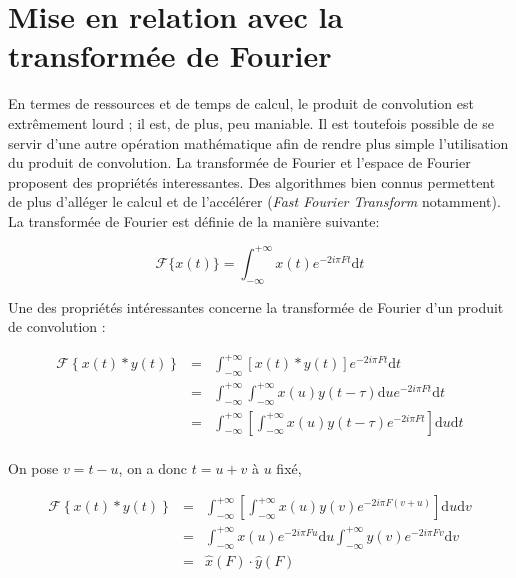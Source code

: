 \section{Mise en relation avec la transformée de Fourier} %

En termes de ressources et de temps de calcul, le produit de convolution est extrêmement lourd ; il est, de plus, peu maniable.
Il est toutefois possible de se servir d'une autre opération mathématique afin de rendre plus simple l'utilisation du produit de convolution.
La transformée de Fourier et l'espace de Fourier proposent des propriétés interessantes. Des algorithmes bien connus permettent de plus d'alléger le calcul et de l'accélérer (\textit{Fast Fourier Transform} notamment).
La transformée de Fourier est définie de la manière suivante:

\begin{equation}
    \mathcal{F}\{x(t)\} = \int_{-\infty}^{+\infty} x(t) e^{-2i\pi Ft} \mathrm dt
\end{equation}

\newpage %

Une des propriétés intéressantes concerne la transformée de Fourier d'un produit de convolution :

\begin{eqnarray*}
    \mathcal{F}\left\{x(t) \ast y(t)\right\} & = & \int_{-\infty}^{+\infty} \left[x(t) \ast y(t)\right] e^{-2i\pi Ft} \mathrm dt \\
    & = & \int_{-\infty}^{+\infty} \int_{-\infty}^{+\infty} x(u)y(t - \tau ) \mathrm du e^{-2i\pi Ft} \mathrm dt \\
    & = & \int_{-\infty}^{+\infty}  \left[ \int_{-\infty}^{+\infty} x(u)y(t - \tau )  e^{-2i\pi Ft} \right] \mathrm du \mathrm dt \\
\end{eqnarray*}

On pose $v= t- u$, on a donc $t= u+v$ à $u$ fixé,

\begin{eqnarray*}
    \mathcal{F}\left\{x(t) \ast y(t)\right\} & = & \int_{-\infty}^{+\infty}  \left[ \int_{-\infty}^{+\infty} x(u)y(v)  e^{-2i\pi F(v+u)} \right] \mathrm du \mathrm dv\\
    & = & \int_{-\infty}^{+\infty}  x(u) e^{-2i\pi Fu}  \mathrm du
    \int_{-\infty}^{+\infty} y(v) e^{-2i\pi Fv} \mathrm dv \\
    & = & \hat{x}(F) \cdot \hat{y}(F)
\end{eqnarray*}

